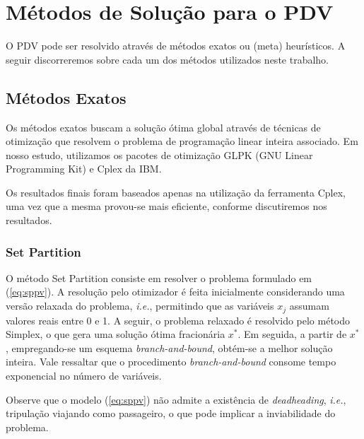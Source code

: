 \documentclass[12pt,a4paper]{article}
\newcommand{\ie}{\emph{i.e.}}                                %
\newcommand{\zerar}{\setcounter{equation}{0}\setcounter{figure}{0}\setcounter{table}{0}}
\begin{document}
\zerar
\section{Métodos de Solução para o PDV}
\label{sec:metodos}

O PDV pode ser resolvido através de métodos exatos ou (meta) heurísticos. A seguir discorreremos
sobre cada um dos métodos utilizados neste trabalho.


\subsection{Métodos Exatos}
\label{sec:metodos_exatos}

Os métodos exatos buscam a solução ótima global através de técnicas de otimização que resolvem o 
problema de programação linear inteira associado. Em nosso estudo, utilizamos os pacotes de 
otimização GLPK (GNU Linear Programming Kit) e Cplex da IBM. 

Os resultados finais foram baseados apenas na utilização da ferramenta Cplex, uma vez que a mesma
provou-se mais eficiente, conforme discutiremos nos resultados.


\subsubsection{Set Partition}
\label{sec:metodos_partition}

O método Set Partition consiste em resolver o problema formulado em (\ref{eq:sppv}). A resolução pelo
otimizador é feita inicialmente considerando uma versão relaxada do problema, \ie, permitindo que as
variáveis $x_j$ assumam valores reais entre 0 e 1. A seguir, o problema relaxado é resolvido pelo 
método Simplex, o que gera uma solução ótima fracionária $x^\ast$. Em seguida, a partir de $x^\ast$,
empregando-se um esquema {\it branch-and-bound}, obtém-se a melhor solução inteira. Vale ressaltar
que o procedimento {\it branch-and-bound} consome tempo exponencial no número de variáveis.

Observe que o modelo (\ref{eq:sppv}) não admite a existência de {\it deadheading}, \ie, tripulação 
viajando como passageiro, o que pode implicar a inviabilidade do problema.
\end{document}
